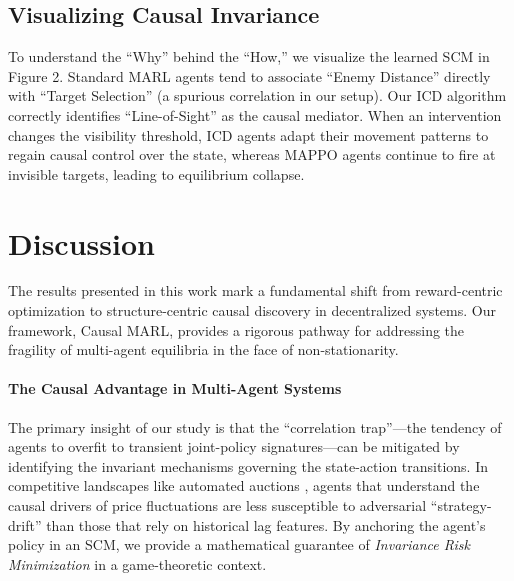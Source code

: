 \begin{table}[h]
\centering
\caption{OOD Performance (Win Rate \%) across 500 episodes with $95\%$ confidence intervals. $\mathcal{I}$ denotes an intervention on the latent causal graph.}
\label{tab:results}
%
\end{table}

\subsection{Visualizing Causal Invariance}
To understand the ``Why'' behind the ``How,'' we visualize the learned SCM in Figure 2. Standard MARL agents tend to associate ``Enemy Distance'' directly with ``Target Selection'' (a spurious correlation in our setup). Our ICD algorithm correctly identifies ``Line-of-Sight'' as the causal mediator. When an intervention changes the visibility threshold, ICD agents adapt their movement patterns to regain causal control over the state, whereas MAPPO agents continue to fire at invisible targets, leading to equilibrium collapse.

\section{Discussion}

The results presented in this work mark a fundamental shift from reward-centric optimization to structure-centric causal discovery in decentralized systems. Our framework, Causal MARL, provides a rigorous pathway for addressing the fragility of multi-agent equilibria in the face of non-stationarity.

\paragraph{The Causal Advantage in Multi-Agent Systems}
The primary insight of our study is that the ``correlation trap''—the tendency of agents to overfit to transient joint-policy signatures—can be mitigated by identifying the invariant mechanisms governing the state-action transitions. In competitive landscapes like automated auctions \cite{ref_new_arxivorg}, agents that understand the causal drivers of price fluctuations are less susceptible to adversarial ``strategy-drift'' than those that rely on historical lag features. By anchoring the agent's policy in an SCM, we provide a mathematical guarantee of \textit{Invariance Risk Minimization} \cite{arjovsky2019invariant} in a game-theoretic context.

